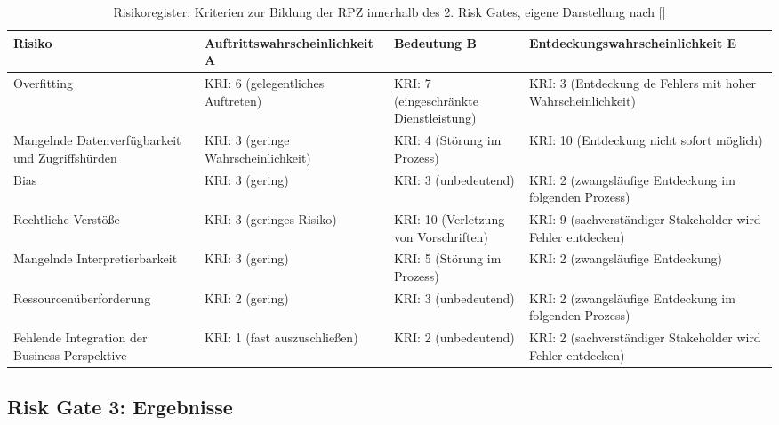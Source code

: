 \begin{table}[H]
\centering
\renewcommand{\arraystretch}{1.3}
\begin{tabular}{|p{3cm}|p{4.9cm}|p{3cm}|p{4.9cm}|}
\hline
\textbf{Risiko} & \textbf{Auftritts\-wahrscheinlichkeit A} & \textbf{Bedeutung B} & \textbf{Entdeckungs\-wahrscheinlichkeit E} \\
\hline

Overfitting 
& KRI: 6 (gelegentliches Auftreten)
& KRI: 7 (eingeschränkte Dienstleistung)
& KRI: 3 (Entdeckung de Fehlers mit hoher Wahrscheinlichkeit) \\
\hline

Mangelnde Datenverfügbarkeit und Zugriffshürden 
& KRI: 3 (geringe Wahrscheinlichkeit)
& KRI: 4 (Störung im Prozess)
& KRI: 10 (Entdeckung nicht sofort möglich) \\
\hline

Bias 
& KRI: 3 (gering)
& KRI: 3 (unbedeutend)
& KRI: 2 (zwangsläufige Entdeckung im folgenden Prozess) \\
\hline

Rechtliche Verstöße
& KRI: 3 (geringes Risiko)
& KRI: 10 (Verletzung von Vorschriften)
& KRI: 9 (sachverständiger Stakeholder wird Fehler entdecken) \\
\hline

Mangelnde Interpretierbarkeit
& KRI: 3 (gering)
& KRI: 5 (Störung im Prozess)
& KRI: 2 (zwangsläufige Entdeckung) \\
\hline

Ressourcenüberforderung
& KRI: 2 (gering)
& KRI: 3 (unbedeutend)
& KRI: 2 (zwangsläufige Entdeckung im folgenden Prozess) \\
\hline

Fehlende Integration der Business Perspektive
& KRI: 1 (fast auszuschließen)
& KRI: 2 (unbedeutend)
& KRI: 2 (sachverständiger Stakeholder wird Fehler entdecken) \\
\hline

\end{tabular}
\caption{Risikoregister: Kriterien zur Bildung der RPZ innerhalb des 2. Risk Gates, eigene Darstellung nach []}
\label{tab:kriterien_rpz}
\end{table}

\subsection{Risk Gate 3: Ergebnisse}

